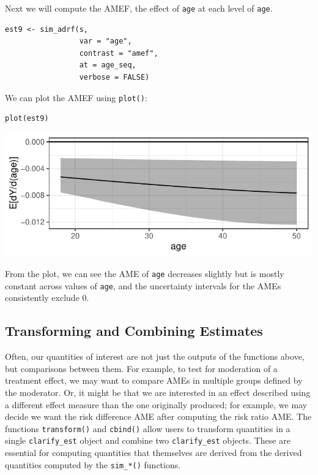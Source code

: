 Next we will compute the AMEF, the effect of \texttt{age} at each level of \texttt{age}.

\begin{verbatim}
est9 <- sim_adrf(s,
                 var = "age",
                 contrast = "amef",
                 at = age_seq,
                 verbose = FALSE)
\end{verbatim}

We can plot the AMEF using \texttt{plot()}:

\begin{verbatim}
plot(est9)
\end{verbatim}

\begin{center}\includegraphics{figures/unnamed-chunk-28-1} \end{center}

From the plot, we can see the AME of \texttt{age} decreases slightly but is mostly constant across values of \texttt{age}, and the uncertainty intervals for the AMEs consistently exclude 0.

\hypertarget{transforming-and-combining-estimates}{%
\subsection{Transforming and Combining Estimates}\label{transforming-and-combining-estimates}}

Often, our quantities of interest are not just the outputs of the functions above, but comparisons between them. For example, to test for moderation of a treatment effect, we may want to compare AMEs in multiple groups defined by the moderator. Or, it might be that we are interested in an effect described using a different effect measure than the one originally produced; for example, we may decide we want the risk difference AME after computing the risk ratio AME. The functions \texttt{transform()} and \texttt{cbind()} allow users to transform quantities in a single \texttt{clarify\_est} object and combine two \texttt{clarify\_est} objects. These are essential for computing quantities that themselves are derived from the derived quantities computed by the \texttt{sim\_*()} functions.

